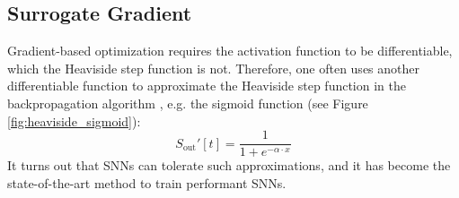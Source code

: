     \subsection{Surrogate Gradient}
    \label{subsec:lif_surrogate}
        Gradient-based optimization requires the activation function to be differentiable, which the Heaviside step function is not. Therefore, one often uses another differentiable function to approximate the Heaviside step function in the backpropagation algorithm \cite{8891809}, e.g. the sigmoid function (see Figure \ref{fig:heaviside_sigmoid}): 
        \begin{equation}
            S_{\text{out}}'[t] = \frac{1}{1 + e^{-\alpha \cdot x}}
        \end{equation}
        It turns out that SNNs can tolerate such approximations, and it has become the state-of-the-art method to train performant SNNs.
